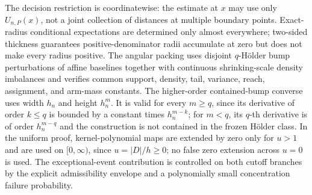 The decision restriction is coordinatewise: the estimate at \(x\) may use only \(U_{n,P}(x)\), not a joint collection of distances at multiple boundary points.  Exact-radius conditional expectations are determined only almost everywhere; two-sided thickness guarantees positive-denominator radii accumulate at zero but does not make every radius positive.  The angular packing uses disjoint \(q\)-H\"older bump perturbations of affine baselines together with continuous shrinking-scale density imbalances and verifies common support, density, tail, variance, reach, assignment, and arm-mass constants.  The higher-order contained-bump converse uses width \(h_n\) and height \(h_n^m\).  It is valid for every \(m\geq q\), since its derivative of order \(k\leq q\) is bounded by a constant times \(h_n^{m-k}\); for \(m<q\), its \(q\)-th derivative is of order \(h_n^{m-q}\) and the construction is not contained in the frozen H\"older class.  In the uniform proof, kernel-polynomial maps are extended by zero only for \(u>1\) and are used on \([0,\infty)\), since \(u=|D|/h\geq0\); no false zero extension across \(u=0\) is used.  The exceptional-event contribution is controlled on both cutoff branches by the explicit admissibility envelope and a polynomially small concentration failure probability.